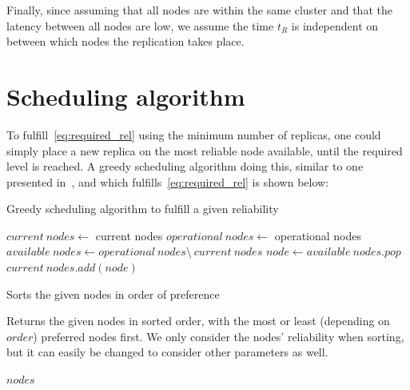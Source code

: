 \documentclass{cslthse-msc}
\begin{document}
Finally, since assuming that all nodes are within the same cluster and that the latency between all nodes are low, we assume the time $t_R$ is independent on between which nodes the replication takes place. 

\section{Scheduling algorithm} \label{sec:design_sched_alg}
To fulfill~\cref{eq:required_rel} using the minimum number of replicas, one could simply place a new replica on the most reliable node available, until the required level is reached. A greedy scheduling algorithm doing this, similar to one presented in~\cite{effTaskReplMobGrid}, and which fulfills~\cref{eq:required_rel} is shown below:

\begin{algorithm}[H]
	\caption{Greedy scheduling algorithm to fulfill a given reliability} \label{alg:scheduling}
	\begin{algorithmic}[1]
	\Statex
	\State $current\ nodes\gets$ current nodes
	\State $operational\ nodes\gets $ operational nodes
	\State $available\ nodes\gets operational\ nodes \setminus \ current\ nodes$
	\State
		\State $node\gets available\ nodes.pop$
		\State
		\State $current\ nodes.add(node)$
	\EndWhile
	\EndProcedure
	\end{algorithmic}
\end{algorithm} 

\begin{function} 
	\caption{Sorts the given nodes in order of preference} \label{func:sort}
	Returns the given nodes in sorted order, with the most or least (depending on $order$) preferred nodes first. We only consider the nodes' reliability when sorting, but it can easily be changed to consider other parameters as well.
	\begin{algorithmic}[1]
	\Statex
		\State
	    \State \Return $nodes$
	\EndFunction
	\end{algorithmic}
\end{function}
\end{document}
